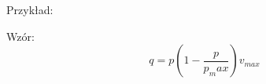 \documentclass[11pt]{IEEEtran}
\begin{document}
Przykład:






Wzór:
$$q=p(1-\frac{p}{p_max})v_{max}$$



\end{document}
